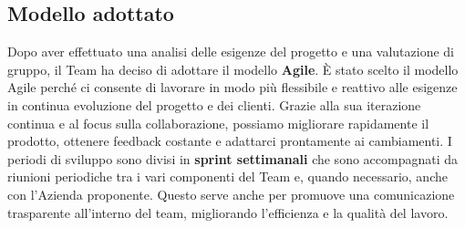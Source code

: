 \documentclass{article}
\begin{document}
    \subsection{Modello adottato}
    Dopo aver effettuato una analisi delle esigenze del progetto e una valutazione
    di gruppo, il Team ha deciso di adottare il modello \textbf{Agile}. È stato scelto il 
    modello Agile perché ci consente di lavorare in modo più flessibile e reattivo 
    alle esigenze in continua evoluzione del progetto e dei clienti. Grazie alla sua 
    iterazione continua e al focus sulla collaborazione, possiamo migliorare rapidamente 
    il prodotto, ottenere feedback costante e adattarci prontamente ai cambiamenti. 
    I periodi di sviluppo sono divisi in \textbf{sprint settimanali} che sono accompagnati da riunioni
    periodiche tra i vari componenti del Team e, quando necessario, anche con l'Azienda proponente.
    Questo serve anche per promuove una comunicazione trasparente all'interno del team, 
    migliorando l'efficienza e la qualità del lavoro.
\end{document}
